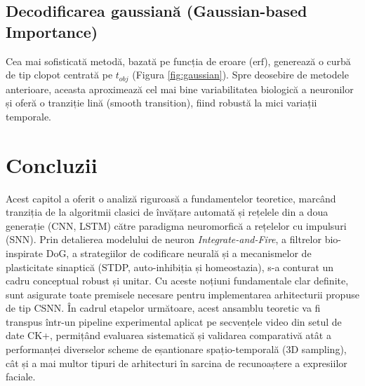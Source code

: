 \subsection*{Decodificarea gaussiană (Gaussian-based Importance)}
Cea mai sofisticată metodă, bazată pe funcția de eroare ($\text{erf}$), generează o curbă de tip clopot centrată pe $t_{obj}$ (Figura \ref{fig:gaussian}). Spre deosebire de metodele anterioare, aceasta aproximează cel mai bine variabilitatea biologică a neuronilor și oferă o tranziție lină (smooth transition), fiind robustă la mici variații temporale.

\section*{Concluzii}
Acest capitol a oferit o analiză riguroasă a fundamentelor teoretice, marcând tranziția de la algoritmii clasici de învățare automată și rețelele din a doua generație (CNN, LSTM) către paradigma neuromorfică a rețelelor cu impulsuri (SNN). Prin detalierea modelului de neuron \textit{Integrate-and-Fire}, a filtrelor bio-inspirate DoG, a strategiilor de codificare neurală și a mecanismelor de plasticitate sinaptică (STDP, auto-inhibiția și homeostazia), s-a conturat un cadru conceptual robust și unitar. Cu aceste noțiuni fundamentale clar definite, sunt asigurate toate premisele necesare pentru implementarea arhitecturii propuse de tip CSNN. În cadrul etapelor următoare, acest ansamblu teoretic va fi transpus într-un pipeline experimental aplicat pe sec\-ven\-țe\-le video din setul de date CK+, permițând evaluarea sistematică și validarea comparativă atât a performanței diverselor scheme de eșantionare spațio-temporală (3D sampling), cât și a mai multor tipuri de arhitecturi în sarcina de re\-cu\-noaș\-te\-re a expresiilor faciale.